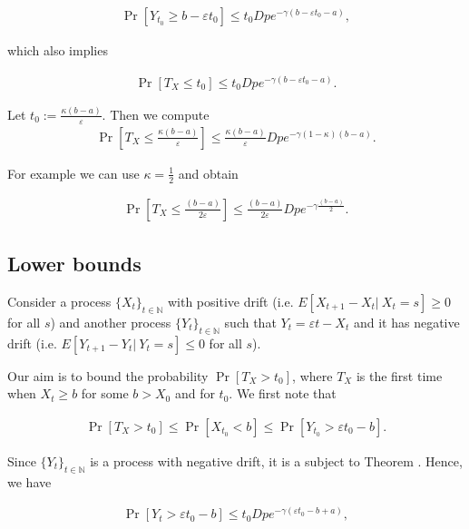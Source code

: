 \documentclass[12pt, a4paper]{article}
\theoremstyle{remark}
\begin{document}
\begin{align*}
    \Pr[Y_{t_0} \geq b - \varepsilon t_0] \leq t_0 D p e^{-\gamma(b - \varepsilon t_0 - a)},
\end{align*}

which also implies

\begin{align*}
    \Pr[T_X \leq t_0] \leq t_0 D p e^{-\gamma(b - \varepsilon t_0 - a)}.
\end{align*}

Let $t_0 := \frac{\kappa (b - a)}{\varepsilon}$. Then we compute
\begin{align*}
    \Pr\left[T_X \leq \frac{\kappa (b - a)}{\varepsilon}\right] \leq \frac{\kappa (b - a)}{\varepsilon} D p e^{-\gamma(1 - \kappa)(b - a)}.
\end{align*}

For example we can use $\kappa = \frac{1}{2}$ and obtain

\begin{align*}
    \Pr\left[T_X \leq \frac{(b - a)}{2\varepsilon}\right] \leq \frac{(b - a)}{2\varepsilon} D p e^{-\gamma\frac{(b - a)}{2}}.
\end{align*}

\subsection{Lower bounds}

Consider a process $\{X_t\}_{t \in \mathbb{N}}$ with positive drift (i.e. $E[X_{t + 1} - X_t |\ X_t = s] \geq 0$ for all $s$) and another process $\{Y_t\}_{t \in \mathbb{N}}$ such that $Y_t = \varepsilon t - X_t$ and it has negative drift (i.e. $E[Y_{t + 1} - Y_t |\ Y_t = s] \leq 0$ for all $s$).

Our aim is to bound the probability $\Pr[T_X > t_0]$, where $T_X$ is the first time when $X_t \geq b$ for some $b > X_0$ and for $t_0$. We first note that

\begin{align*}
    \Pr[T_X > t_0] \leq \Pr[X_{t_0} < b] \leq \Pr[Y_{t_0} > \varepsilon t_0 - b].
\end{align*}

Since $\{Y_t\}_{t \in \mathbb{N}}$ is a process with negative drift, it is a subject to Theorem \cite{}. Hence, we have

\begin{align*}
    \Pr[Y_t > \varepsilon t_0 - b] \leq t_0 D p e^{-\gamma(\varepsilon t_0 - b + a)},
\end{align*}
\end{document}
